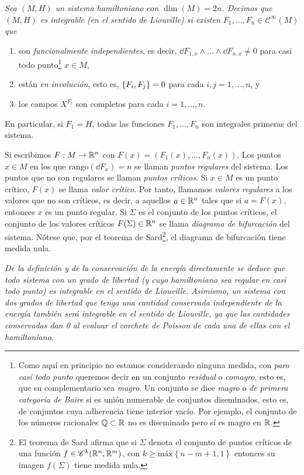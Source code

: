 \begin{defn}\label{integrable}
  \em
  Sea $(M,H)$ un sistema hamiltoniano con $\dim(M)=2n$. Decimos que $(M,H)$ es \emph{integrable (en el sentido de Liouville)} si existen $F_1,\dots,F_n\in \mathscr{C}^{\infty}(M)$ que
\begin{enumerate}
  \item son \emph{funcionalmente independientes}, es decir, $\dd F_{1,x}\wedge \dots \wedge \dd F_{n,x}\neq 0$ para casi todo punto\footnote{Como aquí en principio no estamos considerando ninguna medida, con \emph{para casi todo punto} queremos decir en un conjunto \emph{residual} o \emph{comagro}, esto es, que su complementario sea \emph{magro}. Un conjunto se dice \emph{magro} o \emph{de primera categoría de Baire} si es unión numerable de conjuntos diseminados, esto es, de conjuntos cuya adherencia tiene interior vacío. Por ejemplo, el conjunto de los números racionales $\mathbb{Q}\subset\mathbb{R}$ no es diseminado pero sí es magro en $\mathbb{R}$. } $x\in M$, 
  \item están \emph{en involución}, esto es, $\left\lbrace F_i,F_j\right\rbrace=0$ para cada $i,j=1,\dots,n$, y
  \item  los campos $X^{F_i}$ son completos para cada $i=1,\dots,n$. 
\end{enumerate}
En particular, si $F_1=H$, todas las funciones $F_1,\dots,F_n$ son integrales primeras del sistema.

Si escribimos $F:M\rightarrow \mathbb{R}^n$ con $F(x)=(F_1(x),\dots,F_n(x))$. Los puntos $x\in M$ en los que $\mathrm{rango} (\dd F_x) =n$ se llaman \emph{puntos regulares} del sistema. Los puntos que no son regulares se llaman \emph{puntos críticos}. Si $x\in M$ es un punto crítico, $F(x)$ se llama \emph{valor crítico}. Por tanto, llamamos \emph{valores regulares} a los valores que no son críticos, es decir, a aquellos $a\in \mathbb{R}^n$ tales que si $a=F(x)$, entonces $x$ es un punto regular. Si $\Sigma$ es el conjunto de los puntos críticos, el conjunto de los valores críticos $F(\Sigma)\in \mathbb{R}^n$ se llama \emph{diagrama de bifurcación} del sistema.
Nótese que, por el teorema de Sard\footnote{El teorema de Sard afirma que si $\Sigma$ denota el conjunto de puntos críticos de una función $f\in \mathscr{C}^k(\mathbb{R}^n,\mathbb{R}^m)$, con $k\geq \text{máx}\left\{ n-m+1,1 \right\}$ entonces su imagen $f(\Sigma)$ tiene medida nula.}, el diagrama de bifurcación tiene medida nula.
\end{defn}

\begin{obs}
  \em
  De la definición y de la conservación de la energía directamente se deduce que todo sistema con un grado de libertad (y cuyo hamiltoniano sea regular en casi todo punto) es integrable en el sentido de Liouville. Asimismo, un sistema con dos grados de libertad que tenga una cantidad conservada independiente de la energía también será integrable en el sentido de Liouville, ya que las cantidades conservadas dan 0 al evaluar el corchete de Poisson de cada una de ellas con el hamiltoniano.
\end{obs}

